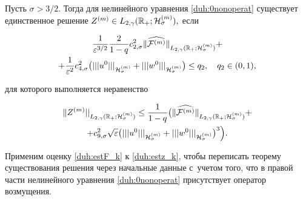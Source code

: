 \begin{theorem}[10]Пусть $\sigma>3/2.$ Тогда для нелинейного уравнения \eqref{duh:0nonoperat} существует единственное решение $Z^{(m)}\in L_{2,\gamma}(\mathbb R_{+};{\cal H}^{(m)}_\sigma),$ если

\begin{multline}

\frac{1}{\varepsilon^{3/2}}\frac{2}{1-q}c^2_{2,\sigma}

\|\widehat{{\cal F}^{(m)}} \|_{L_{2,\gamma}(\mathbb R_{+};{\cal H}^{(m)}_{\sigma})}+

\\

+\frac{1}{\varepsilon^2}c^2_{4,\sigma}

\bigl(|||u^0|||_{{\cal H}^{(m)}_\sigma}+|||w^0|||_{{\cal H}^{(m)}_\sigma}\bigr)\le q_2, \quad  q_2\in(0, 1),

\end{multline}

для которого выполняется неравенство

\begin{multline}

\|Z^{(m)}||_{L_{2,\gamma}(\mathbb R_{+};{\cal H}^{(m)}_{\sigma})} \le \frac{1}{1-q}

\bigl(\| \widehat{{\cal F}^{(m)}} \|_{L_{2,\gamma}(\mathbb R_{+};{\cal H}^{(m)}_{\sigma})}+

\\

+c_{9,\sigma}^2 \sqrt{\varepsilon} \bigl(|||u^0|||_{{\cal H}^{(m)}_\sigma}+|||w^0|||_{{\cal H}^{(m)}_\sigma}\bigr)^3\Bigr). 

\label{duh:estz_k}

\end{multline}

\end{theorem}



\smallskip



Применим оценку \eqref{duh:estF_k} к \eqref{duh:estz_k}, чтобы переписать теорему существования решения через начальные данные с~учетом того, что в правой части нелинейного уравнения \eqref{duh:0nonoperat} присутствует оператор возмущения.



\smallskip



